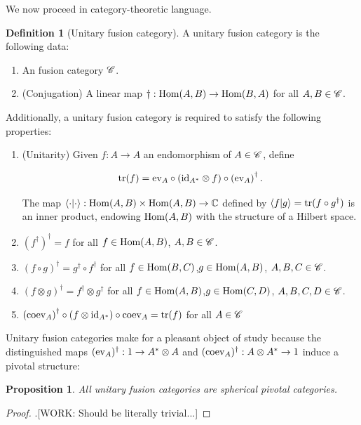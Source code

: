 \documentclass{article}
\newtheorem{proposition}{Proposition}[section]
\theoremstyle{definition}
\newtheorem*{definition}{Definition}
\numberwithin{figure}{section}
\begin{document}
We now proceed in category-theoretic language.

\begin{definition}[Unitary fusion category] A unitary fusion category is the following data:

\begin{enumerate}
\item An fusion category $\mathscr{C}$.
\item (Conjugation) A linear map $\dagger: \mathrm{Hom}(A,B)\to \mathrm{Hom}(B,A)$ for all $A,B\in \mathscr{C}$.
\end{enumerate}

Additionally, a unitary fusion category is required to satisfy the following properties:

\begin{enumerate}
\item (Unitarity) Given $f:A\to A$ an endomorphism of $A\in \mathscr{C}$, define


$$\mathrm{tr}(f)=\mathrm{ev}_A \circ (\mathrm{id}_{A^*}\otimes f)\circ \left(\mathrm{ev}_A\right)^{\dagger}.$$

The map $\left<\cdot|\cdot\right>:\mathrm{Hom}(A,B)\times \mathrm{Hom}(A,B)\to \mathbb{C}$ defined by $\left<f|g\right>=\mathrm{tr}(f\circ g^{\dagger})$ is an inner product, endowing $\mathrm{Hom}(A,B)$ with the structure of a Hilbert space.
\item $\left(f^{\dagger}\right)^{\dagger}=f$ for all $f\in \mathrm{Hom}(A,B)$, $A,B\in \mathscr{C}$.
\item $(f\circ g)^{\dagger}=g^{\dagger}\circ f^{\dagger}$ for all $f\in \mathrm{Hom}(B,C)$,$g\in \mathrm{Hom}(A,B)$, $A,B,C\in \mathscr{C}$.
\item $(f\otimes g)^{\dagger}=f^{\dagger}\otimes g^{\dagger}$ for all $f\in \mathrm{Hom}(A,B)$,$g\in \mathrm{Hom}(C,D)$, $A,B,C,D\in \mathscr{C}$.
\item $\left(\mathrm{coev}_A\right)^{\dagger}\circ (f \otimes \mathrm{id}_{A^*})\circ \mathrm{coev}_A=\mathrm{tr}(f)$ for all $A\in \mathscr{C}$
\end{enumerate}

\raggedleft\qedsymbol{}
\end{definition}

Unitary fusion categories make for a pleasant object of study because the distinguished maps $(\mathrm{ev}_A)^{\dagger}:1\to A^{*}\otimes A$ and $(\mathrm{coev}_A)^{\dagger}:A\otimes A^{*}\to 1$ induce a pivotal structure:

\begin{proposition} All unitary fusion categories are spherical pivotal categories.
\end{proposition}
\begin{proof}.[WORK: Should be literally trivial...]
\end{proof}
\end{document}
